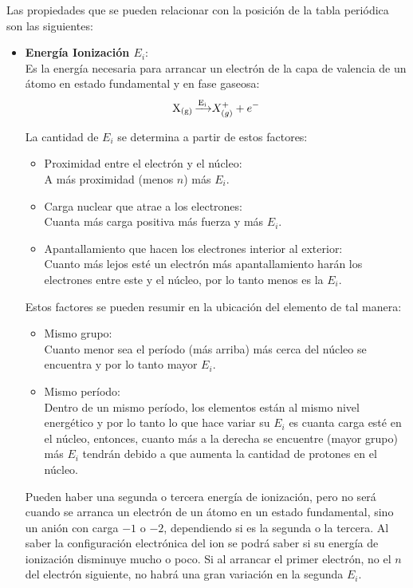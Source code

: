 \documentclass[arial,a4paper,print]{article}
\begin{document}
Las propiedades que se pueden relacionar con la posición de la tabla periódica son las siguientes:
\begin{itemize}
	
\item \textbf{Energía Ionización $E_{i}$}:\\
Es la energía necesaria para arrancar un electrón de la capa de valencia de un átomo en estado fundamental y en fase gaseosa:
\begin{equation*}
	\ce{X_{(g)} \xrightarrow{E_{i}}}X^{+}_{(g)} + e^{-}
\end{equation*}

La cantidad de $E_{i}$ se determina a partir de estos factores:
\begin{itemize}

\item Proximidad entre el electrón y el núcleo:\\
A más proximidad (menos $n$) más $E_{i}$.

\item Carga nuclear que atrae a los electrones:\\
Cuanta más carga positiva más fuerza y más $E_{i}$.

\item Apantallamiento que hacen los electrones interior al exterior:\\
Cuanto más lejos esté un electrón más apantallamiento harán los electrones entre este y el núcleo, por lo tanto menos es la $E_{i}$.

\end{itemize}
Estos factores se pueden resumir en la ubicación del elemento de tal manera:
\begin{itemize}

\item Mismo grupo:\\
Cuanto menor sea el período (más arriba) más cerca del núcleo se encuentra y por lo tanto mayor $E_{i}$. 

\item Mismo período:\\
Dentro de un mismo período, los elementos están al mismo nivel energético y por lo tanto lo que hace variar su $E_{i}$ es cuanta carga esté en el núcleo, entonces, cuanto más a la derecha se encuentre (mayor grupo) más $E_{i}$ tendrán debido a que aumenta la cantidad de protones en el núcleo. 

\end{itemize}

Pueden haber una segunda o tercera energía de ionización, pero no será cuando se arranca un electrón de un átomo en un estado fundamental, sino un anión con carga $-1$ o $-2$, dependiendo si es la segunda o la tercera. Al saber la configuración electrónica del ion se podrá saber si su energía de ionización disminuye mucho o poco. Si al arrancar el primer electrón, no el $n$ del electrón siguiente, no habrá una gran variación en la segunda $E_{i}$. 


\end{itemize}
\end{document}
